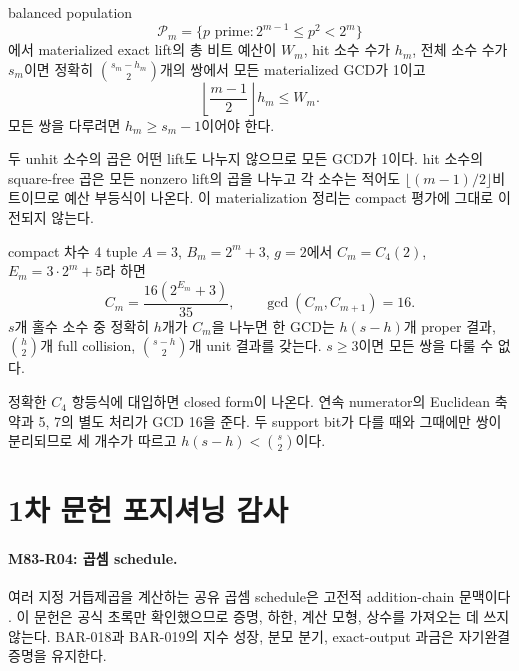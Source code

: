\documentclass[11pt]{article}
\begin{document}
{}
balanced population
\[
\mathcal P_m=\{p\text{ prime}:2^{m-1}\le p^2<2^m\}
\]
에서 materialized exact lift의 총 비트 예산이 \(W_m\), hit 소수 수가
\(h_m\), 전체 소수 수가 \(s_m\)이면 정확히
\(\binom{s_m-h_m}{2}\)개의 쌍에서 모든 materialized GCD가 1이고
\[
\left\lfloor\frac{m-1}{2}\right\rfloor h_m\le W_m.
\]
모든 쌍을 다루려면 \(h_m\ge s_m-1\)이어야 한다.

\begin{claimproof}
두 unhit 소수의 곱은 어떤 lift도 나누지 않으므로 모든 GCD가 1이다.
hit 소수의 square-free 곱은 모든 nonzero lift의 곱을 나누고 각 소수는
적어도 \(\lfloor(m-1)/2\rfloor\)비트이므로 예산 부등식이 나온다. 이
materialization 정리는 compact 평가에 그대로 이전되지 않는다.
\end{claimproof}

{}
compact 차수 4 tuple
\(A=3\), \(B_m=2^m+3\), \(g=2\)에서 \(C_m=C_4(2)\),
\(E_m=3\cdot2^m+5\)라 하면
\[
C_m=\frac{16(2^{E_m}+3)}{35},\qquad
\gcd(C_m,C_{m+1})=16.
\]
\(s\)개 홀수 소수 중 정확히 \(h\)개가 \(C_m\)을 나누면 한 GCD는
\(h(s-h)\)개 proper 결과, \(\binom h2\)개 full collision,
\(\binom{s-h}{2}\)개 unit 결과를 갖는다. \(s\ge3\)이면 모든 쌍을
다룰 수 없다.

\begin{claimproof}
정확한 \(C_4\) 항등식에 대입하면 closed form이 나온다. 연속 numerator의
Euclidean 축약과 5, 7의 별도 처리가 GCD 16을 준다. 두 support bit가
다를 때와 그때에만 쌍이 분리되므로 세 개수가 따르고
\(h(s-h)<\binom s2\)이다.
\end{claimproof}

\appendix

\section{1차 문헌 포지셔닝 감사}
\label{app:cyclotomic-source-positioning}

\paragraph{M83-R04: 곱셈 schedule.}
여러 지정 거듭제곱을 계산하는 공유 곱셈 schedule은 고전적
addition-chain 문맥이다 \cite{yao1976evaluation}. 이 문헌은 공식
초록만 확인했으므로 증명, 하한, 계산 모형, 상수를 가져오는 데 쓰지
않는다. BAR-018과 BAR-019의 지수 성장, 분모 분기, exact-output
과금은 자기완결 증명을 유지한다.
\end{document}
